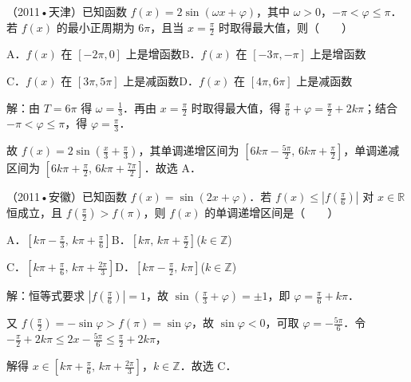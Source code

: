 \begin{question}
（2011•天津）已知函数 $f(x)=2\sin(\omega x+\varphi)$，其中 $\omega>0$，$-\pi<\varphi\leq\pi$．若 $f(x)$ 的最小正周期为 $6\pi$，且当 $x=\frac{\pi}{2}$ 时取得最大值，则（　　）\par
A．$f(x)$ 在 $[-2\pi,0]$ 上是增函数\qquad B．$f(x)$ 在 $[-3\pi,-\pi]$ 上是增函数\par
C．$f(x)$ 在 $[3\pi,5\pi]$ 上是减函数\qquad D．$f(x)$ 在 $[4\pi,6\pi]$ 上是减函数\par
\begin{solution}
解：由 $T=6\pi$ 得 $\omega=\frac13$．再由 $x=\frac{\pi}{2}$ 时取得最大值，得 $\frac{\pi}{6}+\varphi=\frac{\pi}{2}+2k\pi$；结合 $-\pi<\varphi\leq\pi$，得 $\varphi=\frac{\pi}{3}$．\par
故 $f(x)=2\sin(\frac{x}{3}+\frac{\pi}{3})$，其单调递增区间为 $[6k\pi-\frac{5\pi}{2},\,6k\pi+\frac{\pi}{2}]$，单调递减区间为 $[6k\pi+\frac{\pi}{2},\,6k\pi+\frac{7\pi}{2}]$．故选 A．\par
\end{solution}
\end{question}

\begin{question}
（2011•安徽）已知函数 $f(x)=\sin(2x+\varphi)$．若 $f(x)\leq|f(\frac{\pi}{6})|$ 对 $x\in\mathbb R$ 恒成立，且 $f(\frac{\pi}{2})>f(\pi)$，则 $f(x)$ 的单调递增区间是（　　）\par
A．$[k\pi-\frac{\pi}{3},\,k\pi+\frac{\pi}{6}]$\quad B．$[k\pi,\,k\pi+\frac{\pi}{2}]$\quad($k\in\mathbb Z$)\par
C．$[k\pi+\frac{\pi}{6},\,k\pi+\frac{2\pi}{3}]$\quad D．$[k\pi-\frac{\pi}{2},\,k\pi]$\quad($k\in\mathbb Z$)\par
\begin{solution}
解：恒等式要求 $|f(\frac{\pi}{6})|=1$，故 $\sin(\frac{\pi}{3}+\varphi)=\pm1$，即 $\varphi=\frac{\pi}{6}+k\pi$．\par
又 $f(\frac{\pi}{2})=-\sin\varphi>f(\pi)=\sin\varphi$，故 $\sin\varphi<0$，可取 $\varphi=-\frac{5\pi}{6}$．令 $-\frac{\pi}{2}+2k\pi\leq2x-\frac{5\pi}{6}\leq\frac{\pi}{2}+2k\pi$，\par
解得 $x\in[k\pi+\frac{\pi}{6},\,k\pi+\frac{2\pi}{3}]$，$k\in\mathbb Z$．故选 C．\par
\end{solution}
\end{question}

